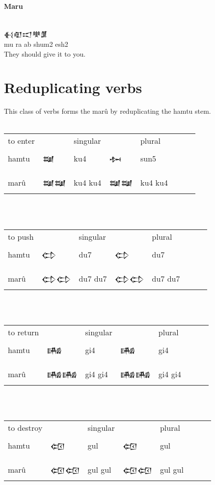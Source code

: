\documentclass[a4paper,12pt]{book}
\newcommand{\fcm}{\large\setmainfont{Akkadian.otf}}
\begin{document}
\paragraph{Maru}\verb||\\
{\fcm 𒈬𒊏𒀊𒋧𒂠}  \\
mu ra ab shum2 esh2\\
They should give it to you.

\section{Reduplicating verbs}
This class of verbs forms the
marû by reduplicating
the hamtu stem.\\

\verb||\\
\begin{tabular}[!h]{l l  l | l l l l l}
to enter  && singular && plural \\
hamtu & {\fcm 𒆭}  & ku4 & {\fcm 𒁔} & sun5 \\
&&&&\\
  marû & {\fcm 𒆭𒆭} &  ku4 ku4 & {\fcm 𒆭𒆭}
  & ku4 ku4\\
\end{tabular}\verb||\\

\verb||\\
\begin{tabular}[!h]{l l  l | l l l l l}
to push  && singular && plural \\
  hamtu & {\fcm 𒌌} & du7  & {\fcm 𒌌} & du7 \\
&&&&\\
  marû & {\fcm 𒌌𒌌} & du7 du7 & {\fcm 𒌌𒌌}
  &  du7 du7 \\
\end{tabular}\verb||\\

\verb||\\
\begin{tabular}[!h]{l l l | l l l l l}
to return  && singular && plural \\
  hamtu & {\fcm 𒄄} &  gi4 & {\fcm 𒄄} &  gi4 \\
&&&&\\
  marû & {\fcm 𒄄𒄄} &  gi4 gi4
  & {\fcm 𒄄𒄄} &  gi4 gi4 \\
\end{tabular}\verb||\\

\verb||\\
\begin{tabular}[!h]{l l l | l l l l l}
to destroy  && singular && plural  \\
  hamtu & {\fcm 𒄢} &  gul & {\fcm 𒄢} & gul \\
&&&&\\
  marû & {\fcm 𒄢𒄢} &  gul gul
  & {\fcm 𒄢𒄢}  & gul gul \\
\end{tabular}\verb||\\
\end{document}
